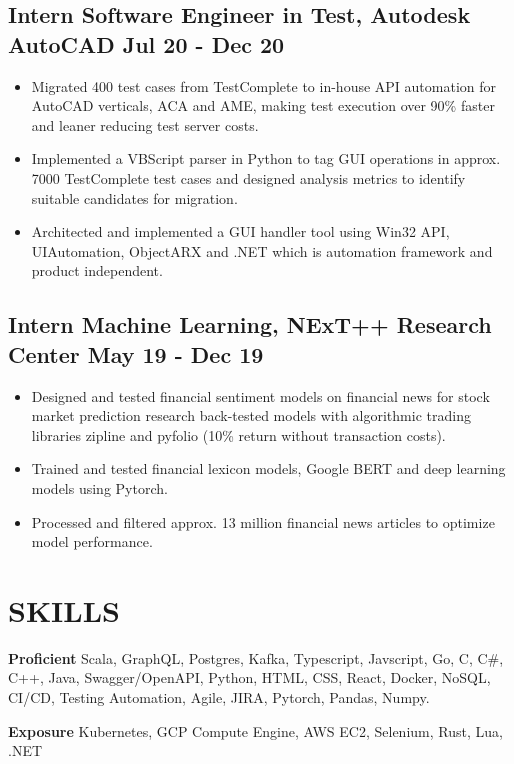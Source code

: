 \documentclass[9pts]{article}
\begin{document}
\subsection*{Intern Software Engineer in Test, Autodesk AutoCAD \hfill Jul 20 - Dec 20}
\begin{itemize}
    \item Migrated 400 test cases from TestComplete to in-house API automation for AutoCAD verticals, ACA and AME, making test execution over 90\% faster and leaner reducing test server costs.
    \item Implemented a VBScript parser in Python to tag GUI operations in approx. 7000 TestComplete test cases and designed analysis metrics to identify suitable candidates for migration.
    \item Architected and implemented a GUI handler tool using Win32 API, UIAutomation, ObjectARX and .NET which is automation framework and product independent.
\end{itemize}

\subsection*{ Intern Machine Learning, NExT++ Research Center \href{https://github.com/GelliFrancesco/assetpriceprediction}{\faGithub} \hfill May 19 - Dec 19}
\begin{itemize}
    \item Designed and tested financial sentiment models on financial news for stock market prediction research back-tested models with algorithmic trading libraries zipline and pyfolio (10\% return without transaction costs).
    \item Trained and tested financial lexicon models, Google BERT and deep learning models using Pytorch.
    \item Processed and filtered approx. 13 million financial news articles to optimize model performance.
\end{itemize}

\section*{SKILLS}
{\large \bf Proficient}
Scala, GraphQL, Postgres, Kafka, Typescript, Javscript, Go, C, C\#, C++, Java,
Swagger/OpenAPI, Python, HTML, CSS, React, Docker, NoSQL, CI/CD, Testing
Automation, Agile, JIRA, Pytorch, Pandas, Numpy.

{\large \bf Exposure}
Kubernetes, GCP Compute Engine, AWS EC2, Selenium, Rust, Lua, .NET
\end{document}
